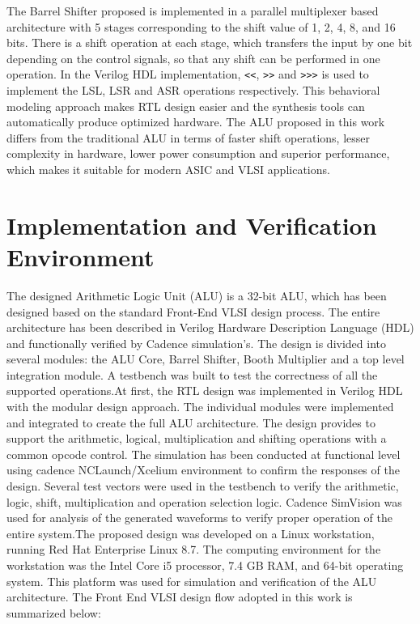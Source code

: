 \documentclass[conference]{IEEEtran}
\begin{document}
The Barrel Shifter proposed is implemented in a parallel multiplexer based architecture with 5 stages corresponding to the shift value of 1, 2, 4, 8, and 16 bits. There is a shift operation at each stage, which transfers the input by one bit depending on the control signals, so that any shift can be performed in one operation. In the Verilog HDL implementation, \texttt{<<}, \texttt{>>} and \texttt{>>>} is used to implement the LSL, LSR and ASR operations respectively. This behavioral modeling approach makes RTL design easier and the synthesis tools can automatically produce optimized hardware. The ALU proposed in this work differs from the traditional ALU in terms of faster shift operations, lesser complexity in hardware, lower power consumption and superior performance, which makes it suitable for modern ASIC and VLSI applications.


\section{Implementation and Verification Environment}

The designed Arithmetic Logic Unit (ALU) is a 32-bit ALU, which has been designed based on the standard Front-End VLSI design process. The entire architecture has been described in Verilog Hardware Description Language (HDL) and functionally verified by Cadence simulation's. The design is divided into several modules: the ALU Core, Barrel Shifter, Booth Multiplier and a top level integration module. A testbench was built to test the correctness of all the supported operations.At first, the RTL design was implemented in Verilog HDL with the modular design approach. The individual modules were implemented and integrated to create the full ALU architecture. The design provides to support the arithmetic, logical, multiplication and shifting operations with a common opcode control.
The simulation has been conducted at functional level using cadence NCLaunch/Xcelium environment to confirm the responses of the design. Several test vectors were used in the testbench to verify the arithmetic, logic, shift, multiplication and operation selection logic. Cadence SimVision was used for analysis of the generated waveforms to verify proper operation of the entire system.The proposed design was developed on a Linux workstation, running Red Hat Enterprise Linux 8.7. The computing environment for the workstation was the Intel Core i5 processor, 7.4 GB RAM, and 64-bit operating system. This platform was used for simulation and verification of the ALU architecture.
The Front End VLSI design flow adopted in this work is summarized below:
\end{document}
